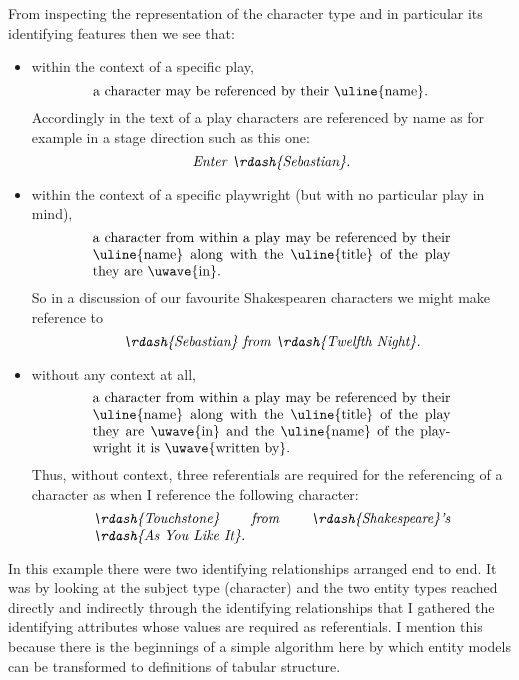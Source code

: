 \mynote
From inspecting the representation of the character type and in particular its identifying features then we see that:
\begin{itemize}
\item within the context of a specific play, 
\begin{equation} 
\label{absoluteCharacterReferencing}
\text{\parbox{9cm}{
a character may be referenced by their \uline{name}.}}
\end{equation}
Accordingly in the text of a play characters are referenced 
by name as for example in a stage direction such as this one:  
\begin{equation*}
\text{\textit{Enter \rdash{Sebastian}.}}
\end{equation*}
\item within the context of a specific playwright (but with no particular play in mind), 
\begin{equation} 
\label{playwrightRelativeCharacterReferencing}
\text{\parbox{9cm}{
 a character from within a play 
may be referenced by their \uline{name} along with the \uline{title} of the play they are \uwave{in}.}}
\end{equation}
So in a discussion of our favourite Shakespearen characters  we might 
make reference to
\begin{equation*}
\text{\textit{\rdash{Sebastian} from \rdash{Twelfth Night}.}}
\end{equation*}
\item
without any context at all, 
\begin{equation} 
\label{absoluteCharacterReferencing}
\text{\parbox{9cm}{a character from within a play 
may be referenced by their \uline{name} along with the \uline{title} of the play they are \uwave{in} and the \uline{name} of the playwright it is \uwave{written by}.}}
\end{equation}
Thus, without context, three referentials are required for the referencing of a character
as  when I reference the following character:
 \begin{equation*}
\label{TounchstoneReferenceFromAbsolute}
\text{\parbox{9cm}{\textit{\rdash{Touchstone} from \rdash{Shakespeare}'s \rdash{As You Like It}. }}}
\end{equation*}
\end{itemize}

\begin{notebox}
In this example there were two identifying relationships arranged end to end. It was by looking at the subject type (character) and the two entity types reached directly and indirectly through the identifying relationships
 that I gathered the identifying attributes whose values are required as referentials. 
I mention this because there is the beginnings of a simple algorithm here by which entity models can be transformed to definitions of tabular structure.
\end{notebox}

